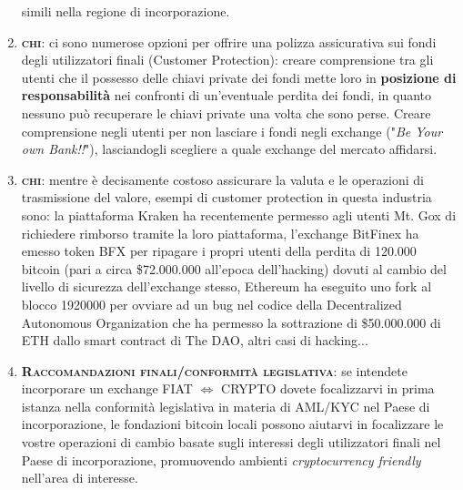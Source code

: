 \documentclass[11pt,fleqn]{book} %
\begin{document}
\begin{enumerate}
	simili nella regione di incorporazione. 
	\item \textbf{\textsc{chi}}: ci sono numerose opzioni per offrire una polizza assicurativa sui fondi degli utilizzatori finali (Customer Protection):
	creare comprensione tra gli utenti che il possesso delle chiavi private dei fondi mette loro in \textbf{posizione di responsabilità} 
	nei confronti di un'eventuale perdita dei fondi, in quanto nessuno può recuperare le chiavi private una volta che sono perse. 
	Creare comprensione negli utenti per non lasciare i fondi negli exchange ("\textit{Be Your own Bank!!}"), lasciandogli scegliere a quale
	exchange del mercato affidarsi.
	\item \textbf{\textsc{chi}}: mentre è decisamente costoso assicurare la valuta e le operazioni di trasmissione del valore, esempi di customer protection
	in questa industria sono: la piattaforma Kraken ha recentemente permesso agli utenti Mt. Gox di richiedere rimborso tramite
	la loro piattaforma, l'exchange BitFinex ha emesso token BFX per ripagare i propri utenti della perdita di 120.000 bitcoin (pari a circa \$72.000.000
	all'epoca dell'hacking) dovuti al cambio del livello di sicurezza dell'exchange stesso, Ethereum ha eseguito uno fork al blocco 1920000
	per ovviare ad un bug nel codice della Decentralized Autonomous Organization che ha permesso la sottrazione di \$50.000.000 di ETH dallo smart contract
	di The DAO, altri casi di hacking...
	\item \textbf{\textsc{Raccomandazioni finali/conformità legislativa}}: se intendete incorporare un exchange 
	FIAT $\Leftrightarrow$ CRYPTO dovete focalizzarvi in prima istanza nella conformità legislativa in materia 
	di AML/KYC nel Paese di incorporazione, le fondazioni
	bitcoin locali possono aiutarvi in focalizzare le vostre operazioni di cambio basate sugli interessi degli utilizzatori finali 
	nel Paese di incorporazione, promuovendo ambienti \textit{cryptocurrency friendly} nell'area di interesse.
\end{enumerate}



\end{document}
